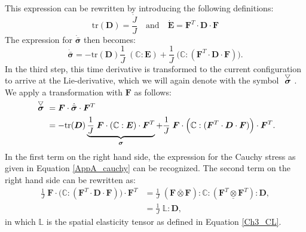 This expression can be rewritten by introducing the following definitions:
\begin{equation}
\text{tr}(\boldsymbol{D}) = \frac{\dot{J}}{J} \quad\text{and}\quad \dot{\boldsymbol{E}}=\boldsymbol{F}^T\cdot\boldsymbol{D}\cdot\boldsymbol{F}
\end{equation}
The expression for $\dot{\bar{\boldsymbol{\sigma}}}$ then becomes:
\begin{equation}
\dot{\bar{\boldsymbol{\sigma}}} = -\text{tr}(\boldsymbol{D})\frac{1}{J}\;(\boldsymbol{\mathbb C}:\boldsymbol{E}) + \frac{1}{J}\;\Big(\boldsymbol{\mathbb C}:(\boldsymbol{F}^T\cdot\boldsymbol{D}\cdot\boldsymbol{F})\Big).
\end{equation}
In the third step, this time derivative is transformed to the current configuration to arrive at the Lie-derivative, which we will again denote with the symbol $\acctriang{\boldsymbol{\sigma}}$. We apply a transformation with $\boldsymbol{F}$ as follows:
\begin{equation}\label{AppA_rateinterm1}
\begin{split}
\acctriang{\boldsymbol{\sigma}} &= \boldsymbol{F}\cdot \dot{\bar{\boldsymbol{\sigma}}} \cdot\boldsymbol{F}^T\\
&= -\text{tr}(\boldsymbol{D})\underbrace{\frac{1}{J}\;\boldsymbol{F}\cdot(\boldsymbol{\mathbb C}:\boldsymbol{E})\cdot\boldsymbol{F}^T}_{\boldsymbol{\sigma}} + \frac{1}{J}\;\boldsymbol{F}\cdot\Big(\boldsymbol{\mathbb C}:(\boldsymbol{F}^T\cdot\boldsymbol{D}\cdot\boldsymbol{F})\Big)\cdot\boldsymbol{F}^T.
\end{split}
\end{equation}
In the first term on the right hand side, the expression for the Cauchy stress as given in Equation \ref{AppA_cauchy} can be recognized. The second term on the right hand side can be rewritten as:
\begin{equation}
\begin{split}
\frac{1}{J}\;\boldsymbol{F}\cdot\Big(\boldsymbol{\mathbb C}:(\boldsymbol{F}^T\cdot\boldsymbol{D}\cdot\boldsymbol{F})\Big)\cdot\boldsymbol{F}^T &= \frac{1}{J}\;(\boldsymbol{F}\overline{\otimes}\boldsymbol{F}):\boldsymbol{\mathbb C}:(\boldsymbol{F}^T\underline{\otimes}\boldsymbol{F}^T):\boldsymbol{D}, \\
&= \frac{1}{J}\; \boldsymbol{\mathbb L}:\boldsymbol{D},
\end{split}
\end{equation}
in which $\boldsymbol{\mathbb L}$ is the spatial elasticity tensor as defined in Equation \ref{Ch3_CL}.\\
